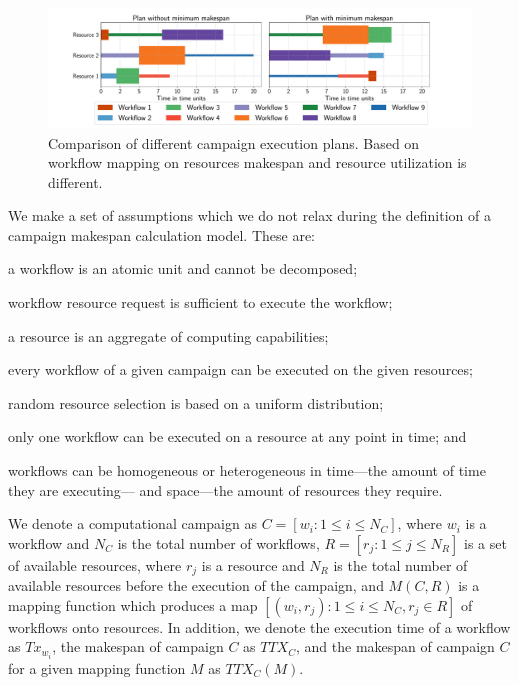 \begin{figure}[ht!]
    \centering
    \includegraphics[width=.99\textwidth]{figures/campaign/plan_comp.pdf}
    \caption{Comparison of different campaign execution plans. Based on workflow mapping on resources makespan and resource utilization is different.}\label{fig:example_makespan}
\end{figure}

We make a set of assumptions which we do not relax during the definition of a 
campaign makespan calculation model. These are:
\begin{inparaenum}[(1)]
    \item a workflow is an atomic unit and cannot be decomposed;
    \item workflow resource request is sufficient to execute the workflow;
    \item a resource is an aggregate of computing capabilities;
    \item every workflow of a given campaign can be executed on the given resources;
    \item random resource selection is based on a uniform distribution;
    \item only one workflow can be executed on a resource at any point in time; and
    \item workflows can be homogeneous or heterogeneous in time---the amount of time they are executing--- and space---the amount of resources they require.
\end{inparaenum}

We denote a computational campaign as $C = [w_{i}: 1 \leq i \leq N_{C}]$, 
where $w_{i}$ is a workflow and $N_{C}$ is the total number of workflows, 
$R = [ r_{j}: 1 \leq j \leq N_{R}]$ is a set of available resources, where 
$r_{j}$ is a resource and $N_{R}$ is the total number of available resources 
before the execution of the campaign, and $ M(C,R) $ is a mapping function 
which produces a map $ [(w_i, r_j): 1 \leq i \leq N_{C}, r_j \in R] $ of 
workflows onto resources. In addition, we denote the execution time of a 
workflow as $Tx_{w_{i}}$, the makespan of campaign $C$ as $TTX_{C}$, and the 
makespan of campaign $C$ for a given mapping function $ M $ as $TTX_{C}(M)$.

